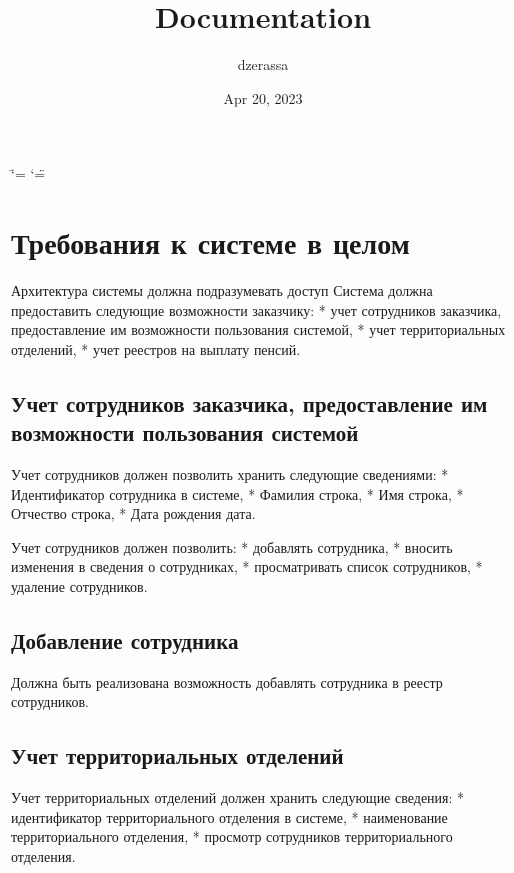 \documentclass[letterpaper,10pt,english]{sphinxmanual}
\title{Documentation}
\date{Apr 20, 2023}
\author{dzerassa}
\begin{document}
\ifdefined\shorthandoff
  \ifnum\catcode`\=\string=\active\shorthandoff{=}\fi
  \ifnum\catcode`\"=\active{}\fi
\fi

\pagestyle{empty}
\sphinxmaketitle
\pagestyle{plain}
\sphinxtableofcontents
\pagestyle{normal}
\label{\detokenize{index::doc}}


\sphinxstepscope


\chapter{Требования к системе в целом}
\label{\detokenize{term:id1}}\label{\detokenize{term::doc}}
\sphinxAtStartPar
Архитектура системы должна подразумевать доступ
Система должна предоставить следующие возможности заказчику:
* учет сотрудников заказчика, предоставление им возможности пользования системой,
* учет территориальных отделений,
* учет реестров на выплату пенсий.


\section{Учет сотрудников заказчика, предоставление им возможности пользования системой}
\label{\detokenize{term:id2}}
\sphinxAtStartPar
Учет сотрудников должен позволить хранить следующие сведениями:
* Идентификатор сотрудника в системе,
* Фамилия \sphinxhyphen{} строка,
* Имя \sphinxhyphen{} строка,
* Отчество \sphinxhyphen{} строка,
* Дата рождения \sphinxhyphen{} дата.

\sphinxAtStartPar
Учет сотрудников должен позволить:
* добавлять сотрудника,
* вносить изменения в сведения о сотрудниках,
* просматривать список сотрудников,
* удаление сотрудников.


\section{Добавление сотрудника}
\label{\detokenize{term:id3}}
\sphinxAtStartPar
Должна быть реализована возможность добавлять сотрудника в реестр сотрудников.


\section{Учет территориальных отделений}
\label{\detokenize{term:id4}}
\sphinxAtStartPar
Учет территориальных отделений должен хранить следующие сведения:
* идентификатор территориального отделения в системе,
* наименование территориального отделения,
* просмотр сотрудников территориального отделения.
\end{document}
